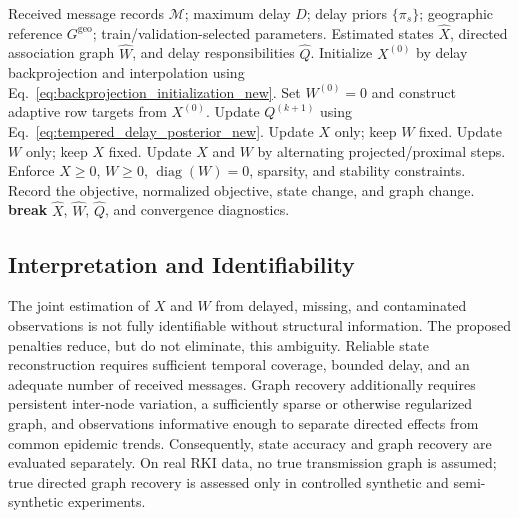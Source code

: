 \begin{algorithm}[!htbp]
\caption{Leakage-safe delay-aware robust graph reconstruction}
\label{alg:revised_method}
\begin{algorithmic}[1]
    \Require Received message records $\mathcal{M}$; maximum delay $D$; delay priors $\{\pi_s\}$; geographic reference $G^{\mathrm{geo}}$; train/validation-selected parameters.
    \Ensure Estimated states $\widehat{X}$, directed association graph $\widehat{W}$, and delay responsibilities $\widehat{Q}$.
    \State Initialize $X^{(0)}$ by delay backprojection and interpolation using Eq.~\eqref{eq:backprojection_initialization_new}.
    \State Set $W^{(0)}=0$ and construct adaptive row targets from $X^{(0)}$.
        \State Update $Q^{(k+1)}$ using Eq.~\eqref{eq:tempered_delay_posterior_new}.
            \State Update $X$ only; keep $W$ fixed.
            \State Update $W$ only; keep $X$ fixed.
        \Else
            \State Update $X$ and $W$ by alternating projected/proximal steps.
        \EndIf
        \State Enforce $X\geq0$, $W\geq0$, $\operatorname{diag}(W)=0$, sparsity, and stability constraints.
        \State Record the objective, normalized objective, state change, and graph change.
            \State \textbf{break}
        \EndIf
    \EndFor
    \State \Return $\widehat{X}$, $\widehat{W}$, $\widehat{Q}$, and convergence diagnostics.
\end{algorithmic}
\end{algorithm}

\subsection{Interpretation and Identifiability}
\label{subsec:identifiability}
The joint estimation of $X$ and $W$ from delayed, missing, and contaminated observations is not fully identifiable without structural information. The proposed penalties reduce, but do not eliminate, this ambiguity. Reliable state reconstruction requires sufficient temporal coverage, bounded delay, and an adequate number of received messages. Graph recovery additionally requires persistent inter-node variation, a sufficiently sparse or otherwise regularized graph, and observations informative enough to separate directed effects from common epidemic trends. Consequently, state accuracy and graph recovery are evaluated separately. On real RKI data, no true transmission graph is assumed; true directed graph recovery is assessed only in controlled synthetic and semi-synthetic experiments.

